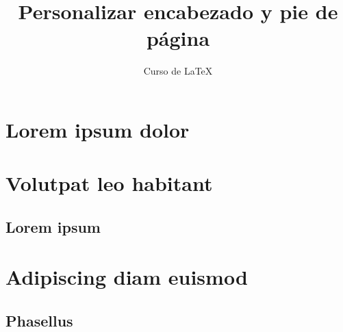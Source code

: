 \documentclass[12pt,letterpaper,oneside]{book}
\author{Curso de LaTeX}
\title{Personalizar encabezado y pie de página}
\begin{document}
\frontmatter
\maketitle
\chapter*{Lorem ipsum dolor}
\lipsum
\tableofcontents
\pagestyle{fancy} %
\mainmatter
\chapter{Volutpat leo habitant}
\thispagestyle{fancy}
\lipsum[1]
\section{Lorem ipsum}
\lipsum
\chapter{Adipiscing diam euismod}
\thispagestyle{fancy} %
\lipsum[2]
\section{Phasellus}
\lipsum
\end{document}
